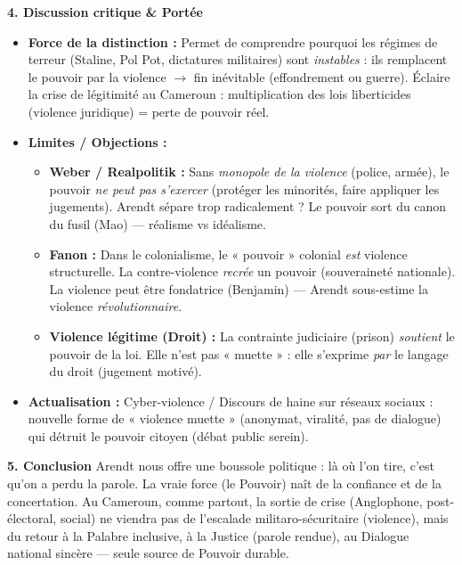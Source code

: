\documentclass[11pt]{article}
\newcommand{\cle}[1]{{\popxbold\color{popdark}#1}}
\begin{document}
\begin{exoresolu}
\textbf{4. Discussion critique \& Portée}
\begin{itemize}
    \item \textbf{Force de la distinction :} Permet de comprendre pourquoi les régimes de \cle{terreur} (Staline, Pol Pot, dictatures militaires) sont \emph{instables} : ils remplacent le pouvoir par la violence $\rightarrow$ fin inévitable (effondrement ou guerre). Éclaire la \cle{crise de légitimité} au Cameroun : multiplication des lois liberticides (violence juridique) = perte de pouvoir réel.
    \item \textbf{Limites / Objections :}
        \begin{itemize}
            \item \textbf{Weber / Realpolitik :} Sans \emph{monopole de la violence} (police, armée), le pouvoir \emph{ne peut pas s'exercer} (protéger les minorités, faire appliquer les jugements). Arendt sépare trop radicalement ? \guillemotleft Le pouvoir sort du canon du fusil \guillemotright (Mao) — réalisme vs idéalisme.
            \item \textbf{Fanon :} Dans le colonialisme, le « pouvoir » colonial \emph{est} violence structurelle. La contre-violence \emph{recrée} un pouvoir (souveraineté nationale). La violence peut être \cle{fondatrice} (Benjamin) — Arendt sous-estime la violence \emph{révolutionnaire}.
            \item \textbf{Violence légitime (Droit) :} La contrainte judiciaire (prison) \emph{soutient} le pouvoir de la loi. Elle n'est pas « muette » : elle s'exprime \emph{par} le langage du droit (jugement motivé).
        \end{itemize}
    \item \textbf{Actualisation :} \cle{Cyber-violence} / \cle{Discours de haine} sur réseaux sociaux : nouvelle forme de « violence muette » (anonymat, viralité, pas de dialogue) qui détruit le \cle{pouvoir citoyen} (débat public serein).
\end{itemize}

\textbf{5. Conclusion}
Arendt nous offre une \cle{boussole politique} : là où l'on tire, c'est qu'on a perdu la parole. La vraie force (le Pouvoir) naît de la \cle{confiance} et de la \cle{concertation}. Au Cameroun, comme partout, la sortie de crise (Anglophone, post-électoral, social) ne viendra pas de l'escalade militaro-sécuritaire (violence), mais du retour à la \cle{Palabre} inclusive, à la \cle{Justice} (parole rendue), au \cle{Dialogue national} sincère — seule source de \cle{Pouvoir} durable.
\end{exoresolu}
\end{document}
